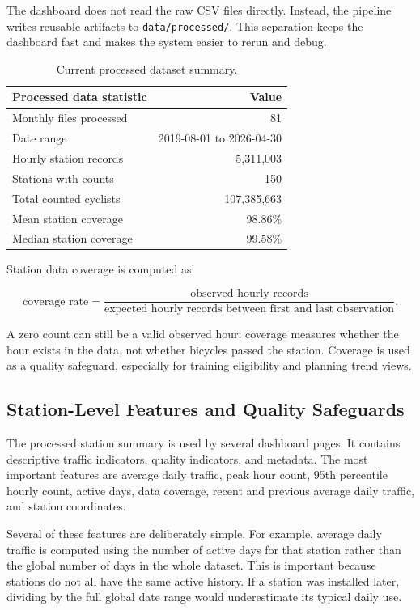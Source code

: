 \documentclass[11pt]{article}
\newcommand{\code}[1]{\texttt{#1}}
\begin{document}
The dashboard does not read the raw CSV files directly. Instead, the pipeline writes reusable artifacts to \code{data/processed/}. This separation keeps the dashboard fast and makes the system easier to rerun and debug.

\begin{table}[htbp]
\centering
\caption{Current processed dataset summary.}
\small
\begin{tabular}{lr}
\toprule
\textbf{Processed data statistic} & \textbf{Value} \\
\midrule
Monthly files processed & 81 \\
Date range & 2019-08-01 to 2026-04-30 \\
Hourly station records & 5,311,003 \\
Stations with counts & 150 \\
Total counted cyclists & 107,385,663 \\
Mean station coverage & 98.86\% \\
Median station coverage & 99.58\% \\
\bottomrule
\end{tabular}
\end{table}

Station data coverage is computed as:

\[
\text{coverage rate} =
\frac{\text{observed hourly records}}{\text{expected hourly records between first and last observation}}.
\]

A zero count can still be a valid observed hour; coverage measures whether the hour exists in the data, not whether bicycles passed the station. Coverage is used as a quality safeguard, especially for training eligibility and planning trend views.

\subsection{Station-Level Features and Quality Safeguards}

The processed station summary is used by several dashboard pages. It contains descriptive traffic indicators, quality indicators, and metadata. The most important features are average daily traffic, peak hour count, 95th percentile hourly count, active days, data coverage, recent and previous average daily traffic, and station coordinates.

Several of these features are deliberately simple. For example, average daily traffic is computed using the number of active days for that station rather than the global number of days in the whole dataset. This is important because stations do not all have the same active history. If a station was installed later, dividing by the full global date range would underestimate its typical daily use.
\end{document}
